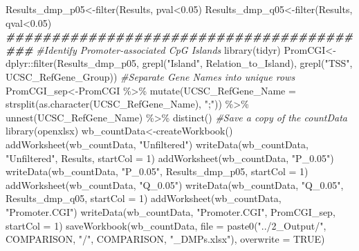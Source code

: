 \documentclass[
  10pt,
]{article}
\newenvironment{Shaded}{\begin{snugshade}}{\end{snugshade}}
\newcommand{\AttributeTok}[1]{\textcolor[rgb]{0.77,0.63,0.00}{#1}}
\newcommand{\CommentTok}[1]{\textcolor[rgb]{0.56,0.35,0.01}{\textit{#1}}}
\newcommand{\ConstantTok}[1]{\textcolor[rgb]{0.00,0.00,0.00}{#1}}
\newcommand{\DecValTok}[1]{\textcolor[rgb]{0.00,0.00,0.81}{#1}}
\newcommand{\DocumentationTok}[1]{\textcolor[rgb]{0.56,0.35,0.01}{\textbf{\textit{#1}}}}
\newcommand{\FloatTok}[1]{\textcolor[rgb]{0.00,0.00,0.81}{#1}}
\newcommand{\FunctionTok}[1]{\textcolor[rgb]{0.00,0.00,0.00}{#1}}
\newcommand{\NormalTok}[1]{#1}
\newcommand{\OtherTok}[1]{\textcolor[rgb]{0.56,0.35,0.01}{#1}}
\newcommand{\SpecialCharTok}[1]{\textcolor[rgb]{0.00,0.00,0.00}{#1}}
\newcommand{\StringTok}[1]{\textcolor[rgb]{0.31,0.60,0.02}{#1}}
\begin{document}
\begin{Shaded}
\begin{Highlighting}[]
\NormalTok{Results\_dmp\_p05}\OtherTok{\textless{}{-}}\FunctionTok{filter}\NormalTok{(Results, pval}\SpecialCharTok{\textless{}}\FloatTok{0.05}\NormalTok{)}
\NormalTok{Results\_dmp\_q05}\OtherTok{\textless{}{-}}\FunctionTok{filter}\NormalTok{(Results, qval}\SpecialCharTok{\textless{}}\FloatTok{0.05}\NormalTok{)}
\DocumentationTok{\#\#\#\#\#\#\#\#\#\#\#\#\#\#\#\#\#\#\#\#\#\#\#\#\#\#\#\#\#\#\#\#\#\#\#\#\#\#\#\#\#}
\CommentTok{\#Identify Promoter{-}associated CpG Islands}
\FunctionTok{library}\NormalTok{(tidyr)}
\NormalTok{PromCGI}\OtherTok{\textless{}{-}}\NormalTok{dplyr}\SpecialCharTok{::}\FunctionTok{filter}\NormalTok{(Results\_dmp\_p05, }\FunctionTok{grepl}\NormalTok{(}\StringTok{"Island"}\NormalTok{, Relation\_to\_Island), }\FunctionTok{grepl}\NormalTok{(}\StringTok{"TSS"}\NormalTok{, UCSC\_RefGene\_Group))}
\CommentTok{\#Separate Gene Names into unique rows}
\NormalTok{PromCGI\_sep}\OtherTok{\textless{}{-}}\NormalTok{PromCGI }\SpecialCharTok{\%\textgreater{}\%} \FunctionTok{mutate}\NormalTok{(}\AttributeTok{UCSC\_RefGene\_Name =} \FunctionTok{strsplit}\NormalTok{(}\FunctionTok{as.character}\NormalTok{(UCSC\_RefGene\_Name), }\StringTok{";"}\NormalTok{)) }\SpecialCharTok{\%\textgreater{}\%} \FunctionTok{unnest}\NormalTok{(UCSC\_RefGene\_Name) }\SpecialCharTok{\%\textgreater{}\%} \FunctionTok{distinct}\NormalTok{()}
\CommentTok{\#Save a copy of the countData}
\FunctionTok{library}\NormalTok{(openxlsx)}
\NormalTok{wb\_countData}\OtherTok{\textless{}{-}}\FunctionTok{createWorkbook}\NormalTok{()}
\FunctionTok{addWorksheet}\NormalTok{(wb\_countData, }\StringTok{"Unfiltered"}\NormalTok{)}
  \FunctionTok{writeData}\NormalTok{(wb\_countData, }\StringTok{"Unfiltered"}\NormalTok{, Results, }\AttributeTok{startCol =} \DecValTok{1}\NormalTok{)}
\FunctionTok{addWorksheet}\NormalTok{(wb\_countData, }\StringTok{"P\_0.05"}\NormalTok{)}
  \FunctionTok{writeData}\NormalTok{(wb\_countData, }\StringTok{"P\_0.05"}\NormalTok{, Results\_dmp\_p05, }\AttributeTok{startCol =} \DecValTok{1}\NormalTok{)}
\FunctionTok{addWorksheet}\NormalTok{(wb\_countData, }\StringTok{"Q\_0.05"}\NormalTok{)}
  \FunctionTok{writeData}\NormalTok{(wb\_countData, }\StringTok{"Q\_0.05"}\NormalTok{, Results\_dmp\_q05, }\AttributeTok{startCol =} \DecValTok{1}\NormalTok{)}
\FunctionTok{addWorksheet}\NormalTok{(wb\_countData, }\StringTok{"Promoter.CGI"}\NormalTok{)}
  \FunctionTok{writeData}\NormalTok{(wb\_countData, }\StringTok{"Promoter.CGI"}\NormalTok{, PromCGI\_sep, }\AttributeTok{startCol =} \DecValTok{1}\NormalTok{)}
\FunctionTok{saveWorkbook}\NormalTok{(wb\_countData, }\AttributeTok{file =} \FunctionTok{paste0}\NormalTok{(}\StringTok{"../2\_Output/"}\NormalTok{, COMPARISON, }\StringTok{"/"}\NormalTok{, COMPARISON, }\StringTok{"\_DMPs.xlsx"}\NormalTok{), }\AttributeTok{overwrite =} \ConstantTok{TRUE}\NormalTok{)}
\end{Highlighting}
\end{Shaded}
\end{document}
